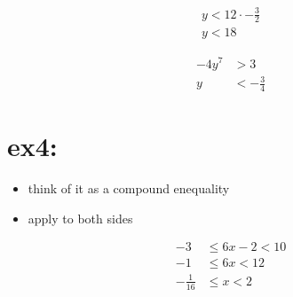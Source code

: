 \documentclass[11pt]{article}
\begin{document}
\begin{align*}
y < 12 \cdot -\frac{3}{2}\\
y < 18
\end{align*}

\begin{align*}
-4y^7 &> 3\\
y &< -\frac{3}{4} 
\end{align*}

\section{ex4:}
\label{sec:org309eb9c}
\begin{itemize}
\item think of it as a compound enequality
\item apply to both sides
\end{itemize}
\begin{align*}
-3 &\leq 6x - 2 < 10\\
-1 &\leq 6x < 12\\
-\frac{1}{16} &\leq x < 2
\end{align*}
\end{document}
